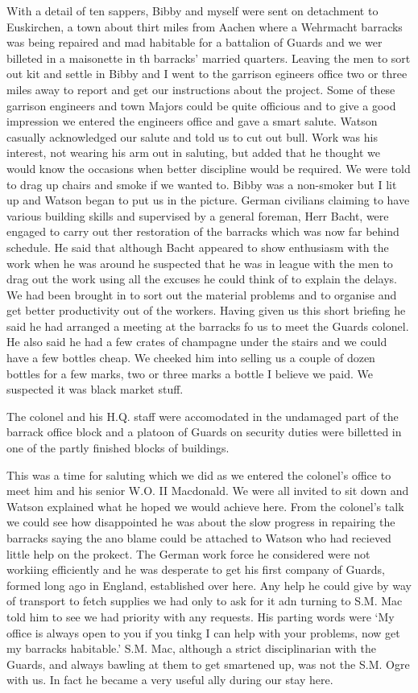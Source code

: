 
With a detail of ten sappers, \Lsergeant Bibby and myself were sent on
detachment to Euskirchen, a town about thirt miles from Aachen where a
Wehrmacht barracks was being repaired and mad habitable for a
battalion of Guards and we wer billeted in a maisonette in th
barracks' married quarters. Leaving the men to sort out kit and settle
in Bibby and I went to the garrison egineers office two or three miles
away to report and get our instructions about the project. Some of
these garrison engineers and town Majors could be quite officious and
to give a good impression we entered the engineers office and gave a
smart salute. \Captain Watson casually acknowledged our salute and told
us to cut out bull. Work was his interest, not wearing his arm out in
saluting, but added that he thought we would know the occasions when
better discipline would be required. We were told to drag up chairs
and smoke if we wanted to. Bibby was a non-smoker but I lit up and
\captain Watson began to put us in the picture. German civilians
claiming to have various building skills and supervised by a general
foreman, Herr Bacht, were engaged to carry out ther restoration of the
barracks which was now far behind schedule. He said that although
Bacht appeared to show enthusiasm with the work when he was around he
suspected that he was in league with the men to drag out the work
using all the excuses he could think of to explain the delays. We had
been brought in to sort out the material problems and to organise and
get better productivity out of the workers. Having given us this short
briefing he said he had arranged a meeting at the barracks fo us to
meet the Guards colonel. He also said he had a few crates of champagne
under the stairs and we could have a few bottles cheap. We cheeked him
into selling us a couple of dozen bottles for a few marks, two or
three marks a bottle I believe we paid. We suspected it was black
market stuff.

The colonel and his H.Q. staff were accomodated in the undamaged part
of the barrack office block and a platoon of Guards on security duties
were billetted in one of the partly finished blocks of buildings.

This was a time for saluting which we did as we entered the colonel's
office to meet him and his senior W.O. II \SergeantM Macdonald. We
were all invited to sit down and \captain Watson explained what he
hoped we would achieve here. From the colonel's talk we could see how
disappointed he was about the slow progress in repairing the barracks
saying the ano blame could be attached to \captain Watson who had
recieved little help on the prokect. The German work force he
considered were not workiing efficiently and he was desperate to get
his first company of Guards, formed long ago in England, established
over here. Any help he could give by way of transport to fetch
supplies we had only to ask for it adn turning to S.M. Mac told him to
see we had priority with any requests. His parting words were `My
office is always open to you if you tinkg I can help with your
problems, now get my barracks habitable.' S.M. Mac, although a strict
disciplinarian with the Guards, and always bawling at them to get
smartened up, was not the S.M. Ogre with us. In fact he became a very
useful ally during our stay here.

